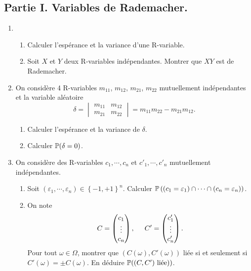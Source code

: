 \subsection*{Partie I. Variables de Rademacher.}
\begin{enumerate}
 \item 
 \begin{enumerate}
  \item Calculer l'espérance et la variance d'une R-variable.
  \item Soit $X$ et $Y$ deux R-variables indépendantes. Montrer que $XY$ est de Rademacher.
 \end{enumerate}

 \item On considère 4 R-variables $m_{11}$, $m_{12}$, $m_{21}$, $m_{22}$ mutuellement indépendantes et la variable aléatoire 
 \[
 \delta = 
  \begin{vmatrix}
   m_{11} & m_{12} \\ m_{21} & m_{22}
  \end{vmatrix} = m_{11}m_{22} - m_{21}m_{12}.
 \]
\begin{enumerate}
 \item Calculer l'espérance et la variance de $\delta$.
 \item Calculer $\mathbb{P}(\delta = 0)$.
\end{enumerate}

 \item On considère des R-variables $c_1,\cdots, c_n$ et $c'_1,\cdots, c'_n$ mutuellement indépendantes.
 \begin{enumerate}
  \item Soit $(\varepsilon_1, \cdots ,\varepsilon_n)\in \left\lbrace -1,+1\right\rbrace^n$. Calculer $\mathbb{P}\left( (c_1=\varepsilon_1) \cap \cdots \cap (c_n = \varepsilon_n)\right)$. 
  \item  On note 
 \[
  C = 
  \begin{pmatrix}
   c_1 \\ \vdots \\ c_n
  \end{pmatrix}, \hspace{0.5cm}
  C' = 
  \begin{pmatrix}
   c'_1 \\ \vdots \\ c'_n
  \end{pmatrix}.
 \]
Pour tout $\omega \in \Omega$, montrer que $(C(\omega),C'(\omega))$ liée si et seulement si $C'(\omega) = \pm C(\omega)$. En déduire $\mathbb{P}( (C,C') \text{ liée}))$.
 \end{enumerate}
\end{enumerate}

